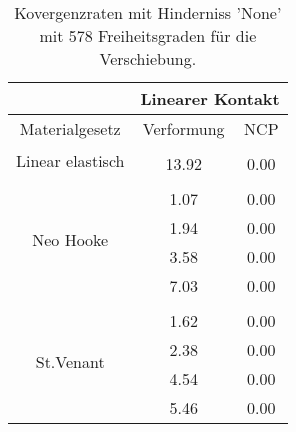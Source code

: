\begin{table} 
\centering 
\begin{tabular}{c|cc|} 
\cline{2-3} 
 & \multicolumn{2}{|c|}{Linearer Kontakt} \\ 
\hline 
\multicolumn{1}{|c|}{Materialgesetz} & \multicolumn{1}{c|}{Verformung} & \multicolumn{1}{c|}{NCP} \\ 
\hline 
\multicolumn{1}{|c|}{\multirow{2}{*}{Linear elastisch}} &\multicolumn{1}{|c|}{} & \multicolumn{1}{|c|}{} \\ 
\multicolumn{1}{|c|}{} & \multicolumn{1}{|c|}{     13.92} & \multicolumn{1}{|c|}{      0.00} \\ 
\hline 
\multicolumn{1}{|c|}{\multirow{5}{*}{Neo Hooke}} &\multicolumn{1}{|c|}{} & \multicolumn{1}{|c|}{} \\ 
\multicolumn{1}{|c|}{} & \multicolumn{1}{|c|}{      1.07} & \multicolumn{1}{|c|}{      0.00} \\ 
\multicolumn{1}{|c|}{} & \multicolumn{1}{|c|}{      1.94} & \multicolumn{1}{|c|}{      0.00} \\ 
\multicolumn{1}{|c|}{} & \multicolumn{1}{|c|}{      3.58} & \multicolumn{1}{|c|}{      0.00} \\ 
\multicolumn{1}{|c|}{} & \multicolumn{1}{|c|}{      7.03} & \multicolumn{1}{|c|}{      0.00} \\ 
\hline 
\multicolumn{1}{|c|}{\multirow{5}{*}{St.Venant}} &\multicolumn{1}{|c|}{} & \multicolumn{1}{|c|}{} \\ 
\multicolumn{1}{|c|}{} & \multicolumn{1}{|c|}{      1.62} & \multicolumn{1}{|c|}{      0.00} \\ 
\multicolumn{1}{|c|}{} & \multicolumn{1}{|c|}{      2.38} & \multicolumn{1}{|c|}{      0.00} \\ 
\multicolumn{1}{|c|}{} & \multicolumn{1}{|c|}{      4.54} & \multicolumn{1}{|c|}{      0.00} \\ 
\multicolumn{1}{|c|}{} & \multicolumn{1}{|c|}{      5.46} & \multicolumn{1}{|c|}{      0.00} \\ 
\hline 
\end{tabular}\caption{Kovergenzraten mit Hinderniss 'None' mit 578 Freiheitsgraden für die Verschiebung.}\label{tab:Rate_None_level3}
\end{table} 
